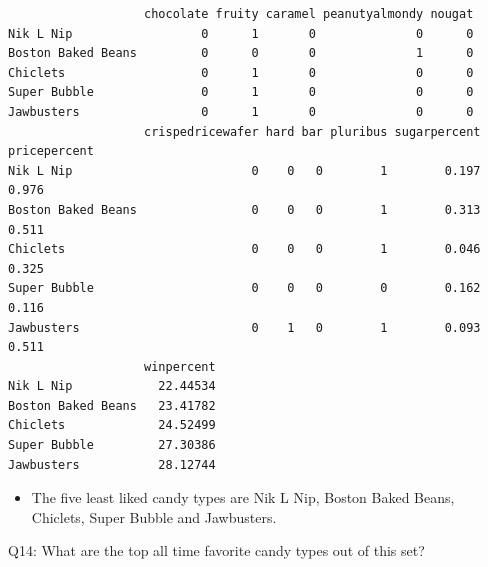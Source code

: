 \documentclass[
  letterpaper,
  DIV=11,
  numbers=noendperiod]{scrartcl}
\newenvironment{Shaded}{\begin{snugshade}}{\end{snugshade}}
\newcommand{\AttributeTok}[1]{\textcolor[rgb]{0.40,0.45,0.13}{#1}}
\newcommand{\ConstantTok}[1]{\textcolor[rgb]{0.56,0.35,0.01}{#1}}
\newcommand{\DecValTok}[1]{\textcolor[rgb]{0.68,0.00,0.00}{#1}}
\newcommand{\FunctionTok}[1]{\textcolor[rgb]{0.28,0.35,0.67}{#1}}
\newcommand{\NormalTok}[1]{\textcolor[rgb]{0.00,0.23,0.31}{#1}}
\newcommand{\SpecialCharTok}[1]{\textcolor[rgb]{0.37,0.37,0.37}{#1}}
\providecommand{\tightlist}{%
  \setlength{\itemsep}{0pt}\setlength{\parskip}{0pt}}\usepackage{longtable,booktabs,array}
\begin{document}
\begin{verbatim}
                   chocolate fruity caramel peanutyalmondy nougat
Nik L Nip                  0      1       0              0      0
Boston Baked Beans         0      0       0              1      0
Chiclets                   0      1       0              0      0
Super Bubble               0      1       0              0      0
Jawbusters                 0      1       0              0      0
                   crispedricewafer hard bar pluribus sugarpercent pricepercent
Nik L Nip                         0    0   0        1        0.197        0.976
Boston Baked Beans                0    0   0        1        0.313        0.511
Chiclets                          0    0   0        1        0.046        0.325
Super Bubble                      0    0   0        0        0.162        0.116
Jawbusters                        0    1   0        1        0.093        0.511
                   winpercent
Nik L Nip            22.44534
Boston Baked Beans   23.41782
Chiclets             24.52499
Super Bubble         27.30386
Jawbusters           28.12744
\end{verbatim}

\begin{itemize}
\tightlist
\item
  The five least liked candy types are Nik L Nip, Boston Baked Beans,
  Chiclets, Super Bubble and Jawbusters.
\end{itemize}

Q14: What are the top all time favorite candy types out of this set?

\begin{Shaded}
\end{Shaded}
\end{document}

